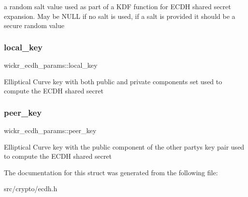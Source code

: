 a random salt value used as part of a K\+DF function for E\+C\+DH shared secret expansion. May be N\+U\+LL if no salt is used, if a salt is provided it should be a secure random value \mbox{\label{structwickr__ecdh__params_aab5a55e6a516ab8268ef6739ae1422cd}} 
\subsubsection{\texorpdfstring{local\+\_\+key}{local\_key}}
{\footnotesize\ttfamily wickr\+\_\+ecdh\+\_\+params\+::local\+\_\+key}

Elliptical Curve key with both public and private components set used to compute the E\+C\+DH shared secret \mbox{\label{structwickr__ecdh__params_ab17d6191b23fa7fd1befd03b2eee4ba9}} 
\subsubsection{\texorpdfstring{peer\+\_\+key}{peer\_key}}
{\footnotesize\ttfamily wickr\+\_\+ecdh\+\_\+params\+::peer\+\_\+key}

Elliptical Curve key with the public component of the other party\textquotesingle{}s key pair used to compute the E\+C\+DH shared secret 

The documentation for this struct was generated from the following file\+:\begin{DoxyCompactItemize}
\item 
src/crypto/ecdh.\+h\end{DoxyCompactItemize}
